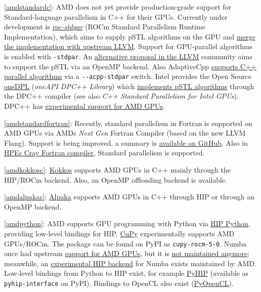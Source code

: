 \item \ref{amdstandardc}: AMD does not yet provide production-grade support for Standard-language parallelism in C++ for their GPUs. Currently under development is \href{https://github.com/ROCmSoftwarePlatform/roc-stdpar}{\emph{roc-stdpar}} (ROCm Standard Parallelism Runtime Implementation), which aims to supply pSTL algorithms on the GPU and \href{https://discourse.llvm.org/t/rfc-adding-c-parallel-algorithm-offload-support-to-clang-llvm/72159}{merge the implementation with upstream LLVM}. Support for GPU-parallel algorithms is enabled with \texttt{-stdpar}. An \href{https://discourse.llvm.org/t/rfc-openmp-offloading-backend-for-c-parallel-algorithms/73468}{alternative proposal in the LLVM} community aims to support the pSTL via an OpenMP backend. Also AdaptiveCpp \href{https://github.com/AdaptiveCpp/AdaptiveCpp/blob/develop/doc/stdpar.md}{supports C++ parallel algorithms} via a \texttt{-\/-acpp-stdpar} switch. Intel provides the Open Source \href{https://github.com/oneapi-src/oneDPL}{oneDPL} (\emph{oneAPI DPC++ Library}) which \href{https://oneapi-src.github.io/oneDPL/parallel_api_main.html}{implements pSTL algorithms} through the DPC++ compiler (see also \emph{C++ Standard Parallelism for Intel GPUs}). DPC++ has \href{https://intel.github.io/llvm-docs/GetStartedGuide.html\#build-dpc-toolchain-with-support-for-hip-amd}{experimental support for AMD GPUs}.
\item \ref{amdstandardfortran}: Recently, standard parallelism in Fortran is supported on AMD GPUs via AMD\textquotesingle s \emph{Next Gen} Fortran Compiler (based on the new LLVM Flang). Support is being improved, a summary is \href{https://github.com/amd/InfinityHub-CI/blob/main/fortran/README.md}{available on GitHub}. Also in \href{https://support.hpe.com/hpesc/public/docDisplay?docId=dp00005037en_us&docLocale=en_US}{HPE\textquotesingle s Cray Fortran compiler}, Standard parallelism is supported.
\item \ref{amdkokkosc}: \href{https://github.com/kokkos/kokkos}{Kokkos} supports AMD GPUs in C++ mainly through the HIP/ROCm backend. Also, an OpenMP offloading backend is available.
\item \ref{amdalpakac}: \href{https://github.com/alpaka-group/alpaka}{Alpaka} supports AMD GPUs in C++ through HIP or through an OpenMP backend.
\item \ref{amdpython}: AMD supports GPU programming with Python via \href{https://github.com/ROCm/hip-python}{HIP Python}, providing low-level bindings for HIP. \href{https://docs.cupy.dev/en/latest/install.html\#using-cupy-on-amd-gpu-experimental}{CuPy} experimentally supports AMD GPUs/ROCm. The package can be found on PyPI as \texttt{cupy-rocm-5-0}. Numba once had upstream \href{https://numba.pydata.org/numba-doc/latest/roc/index.html}{support for AMD GPUs}, but it is \href{https://numba.readthedocs.io/en/stable/release-notes.html\#version-0-54-0-19-august-2021}{not maintained anymore}; meanwhile, an \href{https://github.com/ROCm/numba-hip}{experimental HIP backend} for Numba exists maintained by AMD. Low-level bindings from Python to HIP exist, for example \href{https://github.com/jatinx/PyHIP}{PyHIP} (available as \texttt{pyhip-interface} on PyPI). Bindings to OpenCL also exist (\href{https://documen.tician.de/pyopencl/}{PyOpenCL}).
